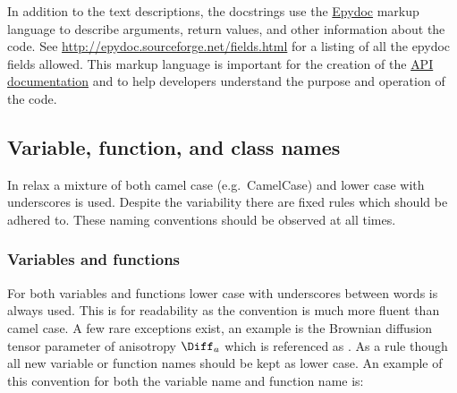 In addition to the text descriptions, the docstrings use the \href{http://epydoc.sourceforge.net/}{Epydoc} markup language to describe arguments, return values, and other information about the code.
See \url{http://epydoc.sourceforge.net/fields.html} for a listing of all the epydoc fields allowed.
This markup language is important for the creation of the \href{http://www.nmr-relax.com/api/}{API documentation} and to help developers understand the purpose and operation of the code.


\subsection{Variable, function, and class names}

In relax a mixture of both camel case (e.g.\ CamelCase) and lower case with underscores is used.
Despite the variability there are fixed rules which should be adhered to.
These naming conventions should be observed at all times.



\subsubsection{Variables and functions}

For both variables and functions lower case with underscores between words is always used.
This is for readability as the convention is much more fluent than camel case.
A few rare exceptions exist, an example is the Brownian diffusion tensor parameter of anisotropy $\Diff_a$ which is referenced as .
As a rule though all new variable or function names should be kept as lower case.
An example of this convention for both the variable name and function name is:

